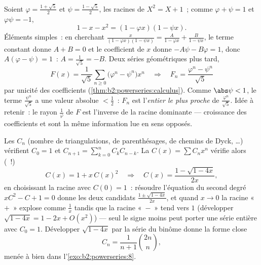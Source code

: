 \begin{example}\label{ex:b2:powerseries:binet}
Soient $\varphi = \frac{1+\sqrt5}{2}$ et $\psi =
\frac{1-\sqrt5}{2}$, les racines de $X^2 = X + 1$~; comme $\varphi
+ \psi = 1$ et $\varphi\psi = -1$,
\[
1 - x - x^2 = (1 - \varphi x)(1 - \psi x) .
\]
Éléments simples~: en cherchant $\frac{x}{(1-\varphi x)(1-\psi x)} =
\frac{A}{1 - \varphi x} + \frac{B}{1 - \psi x}$, le terme
constant donne $A + B = 0$ et le coefficient de $x$ donne $-A\psi - B\varphi
= 1$, donc $A(\varphi - \psi) = 1$~: $A = \frac{1}{\sqrt5} = -B$.
Deux séries géométriques plus tard,
\[
F(x) = \frac{1}{\sqrt5}\sum_{n\geq0}
\bigl(\varphi^n - \psi^n\bigr)x^n
\quad\Longrightarrow\quad
F_n = \frac{\varphi^n - \psi^n}{\sqrt5}
\]
par unicité des coefficients
(\cref{thm:b2:powerseries:calculus}). Comme $\abs\psi < 1$, le
terme $\frac{\psi^n}{\sqrt5}$ a une valeur absolue $< \frac12$~:
$F_n$ est l'\emph{entier le plus proche} de
$\frac{\varphi^n}{\sqrt5}$. Idée à retenir~: le rayon
$\frac1\varphi$ de $F$ est l'inverse de la racine dominante
--- croissance des coefficients et  sont la
même information lue en sens opposés.
\end{example}

\begin{example}\label{ex:b2:powerseries:catalan}
Les  $C_n$ (nombre de triangulations, de
parenthésages, de chemins de Dyck, \dots) vérifient $C_0 = 1$ et
$C_{n+1} = \sum_{k=0}^n C_kC_{n-k}$. La  $C(x) =
\sum C_nx^n$ vérifie alors (~!)
\[
C(x) = 1 + x\,C(x)^2
\quad\Longrightarrow\quad
C(x) = \frac{1 - \sqrt{1 - 4x}}{2x} ,
\]
en choisissant la racine avec $C(0) = 1$~: résoudre l'équation du
second degré $xC^2 - C + 1 = 0$ donne les deux candidats $\frac{1 \pm
\sqrt{1-4x}}{2x}$, et quand $x \to 0$ la racine «~$+$~» explose
comme $\frac1x$ tandis que la racine «~$-$~» tend vers $1$ (développer
$\sqrt{1-4x} = 1 - 2x + O(x^2)$) --- seul le signe moins peut
porter une série entière avec $C_0 = 1$. Développer $\sqrt{1 - 4x}$ par la
série du binôme donne la forme close
\[
C_n = \frac{1}{n+1}\binom{2n}{n} ,
\]
menée à bien dans l'\cref{exo:b2:powerseries:8}.
\end{example}


